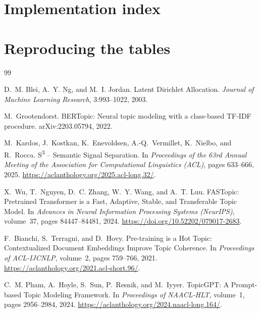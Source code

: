 \appendix
\section{Implementation index}
\label{sec:appendix-code}

\section{Reproducing the tables}

\begin{thebibliography}{99}

D.~M. Blei, A.~Y. Ng, and M.~I. Jordan.
\newblock Latent Dirichlet Allocation.
\newblock \emph{Journal of Machine Learning Research}, 3:993--1022, 2003.

M.~Grootendorst.
\newblock BERTopic: Neural topic modeling with a class-based TF-IDF procedure.
\newblock arXiv:2203.05794, 2022.

M.~Kardos, J.~Kostkan, K.~Enevoldsen, A.-Q.~Vermillet, K.~Nielbo, and R.~Rocca.
\newblock S\textsuperscript{3} -- Semantic Signal Separation.
\newblock In \emph{Proceedings of the 63rd Annual Meeting of the Association for Computational
Linguistics (ACL)}, pages 633--666, 2025. \url{https://aclanthology.org/2025.acl-long.32/}.

X.~Wu, T.~Nguyen, D.~C. Zhang, W.~Y. Wang, and A.~T. Luu.
\newblock FASTopic: Pretrained Transformer is a Fast, Adaptive, Stable, and Transferable Topic Model.
\newblock In \emph{Advances in Neural Information Processing Systems (NeurIPS)}, volume~37,
pages 84447--84481, 2024.
\url{https://doi.org/10.52202/079017-2683}.

F.~Bianchi, S.~Terragni, and D.~Hovy.
\newblock Pre-training is a Hot Topic: Contextualized Document Embeddings Improve Topic Coherence.
\newblock In \emph{Proceedings of ACL-IJCNLP}, volume~2, pages 759--766, 2021.
\url{https://aclanthology.org/2021.acl-short.96/}.

C.~M. Pham, A.~Hoyle, S.~Sun, P.~Resnik, and M.~Iyyer.
\newblock TopicGPT: A Prompt-based Topic Modeling Framework.
\newblock In \emph{Proceedings of NAACL-HLT}, volume~1, pages 2956--2984, 2024.
\url{https://aclanthology.org/2024.naacl-long.164/}.


\end{thebibliography}
